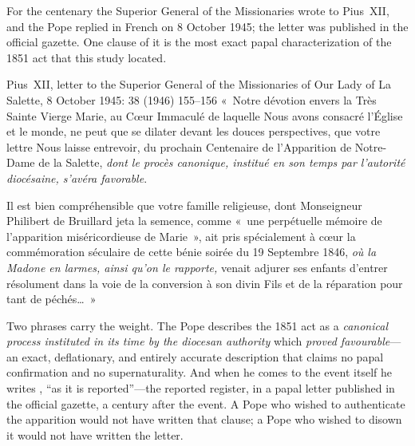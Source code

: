 For the centenary the Superior General of the Missionaries wrote to
Pius~XII, and the Pope replied in French on 8 October 1945; the
letter was published in the official gazette. One clause of it is
the most exact papal characterization of the 1851 act that this
study located.

\begin{operativetext}{Pius~XII, letter to the Superior General of
the Missionaries of Our Lady of La Salette, 8 October 1945:
 38 (1946) 155--156}
«~Notre dévotion envers la Très Sainte Vierge Marie, au Cœur
Immaculé de laquelle Nous avons consacré l'Église et le monde, ne
peut que se dilater devant les douces perspectives, que votre lettre
Nous laisse entrevoir, du prochain Centenaire de l'Apparition de
Notre-Dame de la Salette, \emph{dont le procès canonique, institué
en son temps par l'autorité diocésaine, s'avéra favorable}.\par
Il est bien compréhensible que votre famille religieuse, dont
Monseigneur Philibert de Bruillard jeta la semence, comme «~une
perpétuelle mémoire de l'apparition miséricordieuse de Marie~», ait
pris spécialement à cœur la commémoration séculaire de cette bénie
soirée du 19 Septembre 1846, \emph{où la Madone en larmes, ainsi
qu'on le rapporte,} venait adjurer ses enfants d'entrer résolument
dans la voie de la conversion à son divin Fils et de la réparation
pour tant de péchés\ldots~»
\end{operativetext}

Two phrases carry the weight. The Pope describes the 1851 act as a
\emph{canonical process instituted in its time by the diocesan
authority} which \emph{proved favourable}---an exact, deflationary,
and entirely accurate description that claims no papal confirmation
and no supernaturality. And when he comes to the event itself he
writes , ``as it is reported''---the
reported register, in a papal letter published in the official
gazette, a century after the event. A Pope who wished to authenticate
the apparition would not have written that clause; a Pope who wished
to disown it would not have written the letter.

